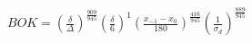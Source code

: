 \documentclass{article}
\begin{document}
\begin{center}
$BOK = (\frac{\delta}{\Delta})^{\frac{909}{945}}(\frac{\delta}{6})^1(\frac{x_{-1} - x_0}{180})^{\frac{416}{945}}(\frac{1}{\sigma_d})^{\frac{889}{945}}$\\
\end{center}
\end{document}
